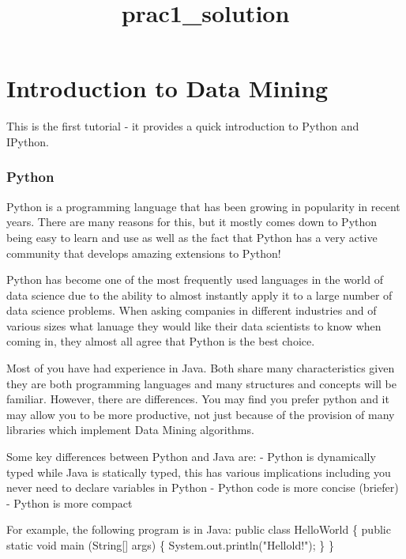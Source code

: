 \documentclass[11pt]{article}
\title{prac1\_solution}
\begin{document}
    
    
    \maketitle
    
    

    
    \section{Introduction to Data Mining}\label{introduction-to-data-mining}

    This is the first tutorial - it provides a quick introduction to Python
and IPython.

    \subsubsection{Python}\label{python}

    Python is a programming language that has been growing in popularity in
recent years. There are many reasons for this, but it mostly comes down
to Python being easy to learn and use as well as the fact that Python
has a very active community that develops amazing extensions to Python!

Python has become one of the most frequently used languages in the world
of data science due to the ability to almost instantly apply it to a
large number of data science problems. When asking companies in
different industries and of various sizes what lanuage they would like
their data scientists to know when coming in, they almost all agree that
Python is the best choice.

Most of you have had experience in Java. Both share many characteristics
given they are both programming languages and many structures and
concepts will be familiar. However, there are differences. You may find
you prefer python and it may allow you to be more productive, not just
because of the provision of many libraries which implement Data Mining
algorithms.

Some key differences between Python and Java are: - Python is
dynamically typed while Java is statically typed, this has various
implications including you never need to declare variables in Python -
Python code is more concise (briefer) - Python is more compact

For example, the following program is in Java: public class HelloWorld
\{ public static void main (String{[}{]} args) \{
System.out.println("Hellold!"); \} \}
\end{document}
